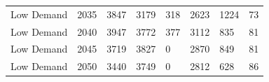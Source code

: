 \documentclass[preprint,12pt]{elsarticle}
\begin{document}
\begin{table}[h]
\begin{tabular}{llllllll}
    Low Demand                            & 2035                              & 3847                                                                                             & 3179                                                                                             & 318                                                                                                & 2623                                                                                                               & 1224                                                                                                          & 73                                                                                            \\
    Low Demand                            & 2040                              & 3947                                                                                             & 3772                                                                                             & 377                                                                                                & 3112                                                                                                               & 835                                                                                                           & 81                                                                                            \\
    Low Demand                            & 2045                              & 3719                                                                                             & 3827                                                                                             & 0                                                                                                  & 2870                                                                                                               & 849                                                                                                           & 81                                                                                            \\
    Low Demand                            & 2050                              & 3440                                                                                             & 3749                                                                                             & 0                                                                                                  & 2812                                                                                                               & 628                                                                                                           & 86                                                                                            \\

\end{tabular}
\end{table}
\end{document}

